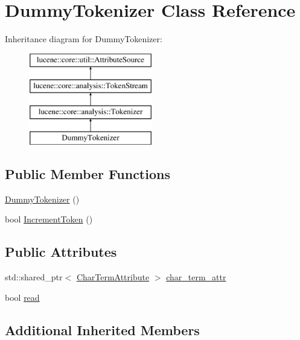 \hypertarget{classDummyTokenizer}{}\section{Dummy\+Tokenizer Class Reference}
\label{classDummyTokenizer}
Inheritance diagram for Dummy\+Tokenizer\+:\begin{figure}[H]
\begin{center}
\leavevmode
\includegraphics[height=4.000000cm]{classDummyTokenizer}
\end{center}
\end{figure}
\subsection*{Public Member Functions}
\begin{DoxyCompactItemize}
\item 
\mbox{\hyperlink{classDummyTokenizer_a42b1fc7050177a061fc4cd35fa3ddee3}{Dummy\+Tokenizer}} ()
\item 
bool \mbox{\hyperlink{classDummyTokenizer_a11402de15d04027b30ce918814e1723d}{Increment\+Token}} ()
\end{DoxyCompactItemize}
\subsection*{Public Attributes}
\begin{DoxyCompactItemize}
\item 
std\+::shared\+\_\+ptr$<$ \mbox{\hyperlink{classlucene_1_1core_1_1analysis_1_1tokenattributes_1_1CharTermAttribute}{Char\+Term\+Attribute}} $>$ \mbox{\hyperlink{classDummyTokenizer_a6bfd1c116c7c2f98be9a605dc985f534}{char\+\_\+term\+\_\+attr}}
\item 
bool \mbox{\hyperlink{classDummyTokenizer_aa9c8e2fcc234b7adcc1d1f1c9dc1716f}{read}}
\end{DoxyCompactItemize}
\subsection*{Additional Inherited Members}


